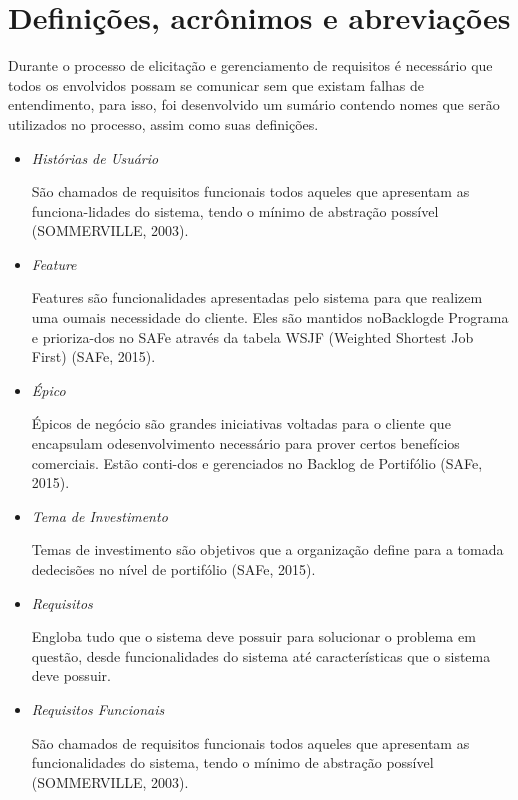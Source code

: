 \section{Definições, acrônimos e abreviações}

Durante o processo de elicitação e gerenciamento de requisitos é necessário que todos os envolvidos possam se comunicar sem que existam falhas de entendimento, para isso, foi desenvolvido um sumário contendo nomes que serão utilizados no processo, assim como suas definições.

\begin{itemize}

	\item \textit{Histórias de Usuário}

		São chamados de requisitos funcionais todos aqueles que apresentam as funciona-lidades do sistema, tendo o mínimo de abstração possível (SOMMERVILLE, 2003).

	\item \textit{Feature}

		Features são funcionalidades apresentadas pelo sistema para que realizem uma oumais necessidade do cliente. Eles são mantidos noBacklogde Programa e prioriza-dos no SAFe através da tabela WSJF (Weighted Shortest Job First) (SAFe, 2015).

	\item \textit{Épico}

		Épicos de negócio são grandes iniciativas voltadas para o cliente que encapsulam odesenvolvimento necessário para prover certos benefícios comerciais.  Estão conti-dos e gerenciados no Backlog de Portifólio (SAFe, 2015).

	\item \textit{Tema de Investimento}

		Temas de investimento são objetivos que a organização define para a tomada dedecisões no nível de portifólio (SAFe, 2015).

	\item \textit{Requisitos} 

		Engloba tudo que o sistema deve possuir para solucionar o problema em questão, desde funcionalidades do sistema até características que o sistema deve possuir.

	\item \textit{Requisitos Funcionais}

		São chamados de requisitos funcionais todos aqueles que apresentam as funcionalidades do sistema, tendo o mínimo de abstração possível (SOMMERVILLE, 2003).
		

\end{itemize}
